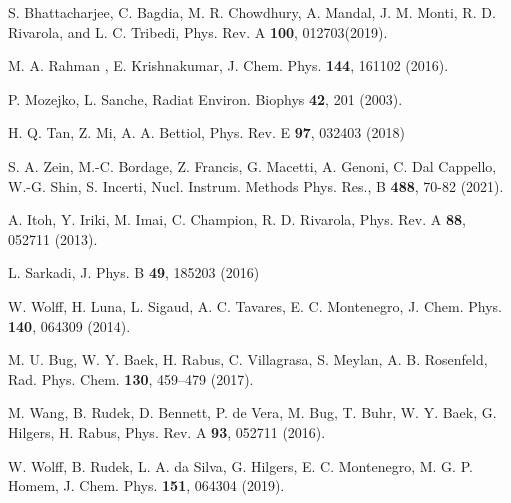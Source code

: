 \begin{thebibliography}{9}
S. Bhattacharjee, C. Bagdia, M. R. Chowdhury, A. Mandal, J. M. Monti, 
R. D. Rivarola, and L. C. Tribedi, 
Phys. Rev. A \textbf{100}, 012703(2019).

M. A. Rahman , E. Krishnakumar,
J. Chem. Phys. \textbf{144}, 161102 (2016).

P. Mozejko, L. Sanche, 
Radiat Environ. Biophys \textbf{42}, 201 (2003).

H. Q. Tan, Z. Mi, A. A. Bettiol, 
Phys. Rev. E \textbf{97}, 032403 (2018)

S. A. Zein, M.-C. Bordage, Z. Francis, G. Macetti, A. Genoni, 
C. Dal Cappello, W.-G. Shin, S. Incerti,
Nucl. Instrum. Methods Phys. Res., B \textbf{488}, 70-82 (2021).

A. Itoh, Y. Iriki, M. Imai, C. Champion, R. D. Rivarola, 
Phys. Rev. A \textbf{88}, 052711 (2013).

L. Sarkadi, 
J. Phys. B \textbf{49}, 185203 (2016)

W. Wolff, H. Luna, L. Sigaud, A. C. Tavares, E. C. Montenegro,
J. Chem. Phys. \textbf{140}, 064309 (2014).

M. U. Bug, W. Y. Baek, H. Rabus, C. Villagrasa, S. Meylan, A. B. Rosenfeld,
Rad. Phys. Chem. \textbf{130}, 459--479 (2017).

M. Wang, B. Rudek, D. Bennett, P. de Vera, M. Bug, T. Buhr, W. Y. Baek, 
G. Hilgers, H. Rabus, 
Phys. Rev. A \textbf{93}, 052711 (2016).

W. Wolff, B. Rudek, L. A. da Silva, G. Hilgers, E. C. Montenegro, 
M. G. P. Homem,
J. Chem. Phys. \textbf{151}, 064304 (2019).


\end{thebibliography}
